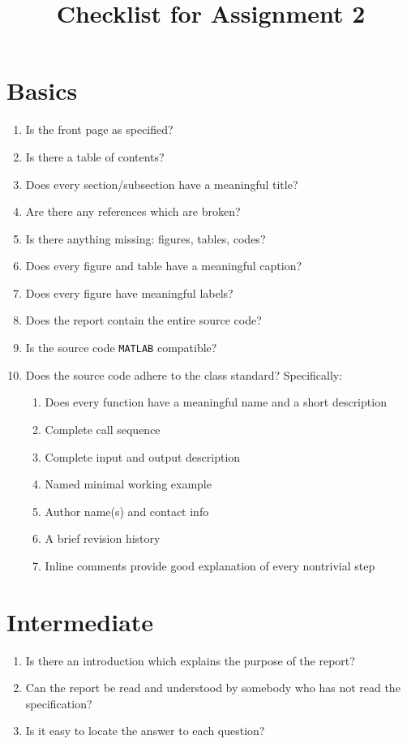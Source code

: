 \documentclass[a4paper,12pt]{article}
\title{Checklist for Assignment 2}
\date{\vspace{-5em}}
\begin{document}
\maketitle
\section{Basics}

\begin{enumerate}
\item Is the front page as specified?
\item Is there a table of contents?
\item Does every section/subsection have a meaningful title?
\item Are there any references which are broken?
\item Is there anything missing: figures, tables, codes?
\item Does every figure and table have a meaningful caption?
\item Does every figure have meaningful labels?
\item Does the report contain the entire source code?
\item Is the source code {\tt MATLAB} compatible?
\item Does the source code adhere to the class standard? Specifically:
  \begin{enumerate}
  \item Does every function have a meaningful name and a short description
  \item Complete call sequence
  \item Complete input and output description
  \item Named minimal working example
  \item Author name(s) and contact info
  \item A brief revision history
  \item Inline comments provide good explanation of every nontrivial step
  \end{enumerate}
\end{enumerate}

\section{Intermediate}

\begin{enumerate}
\item Is there an introduction which explains the purpose of the report?
\item Can the report be read and understood by somebody who has not read the specification?
\item Is it easy to locate the answer to each question?
\end{enumerate}
\end{document}

